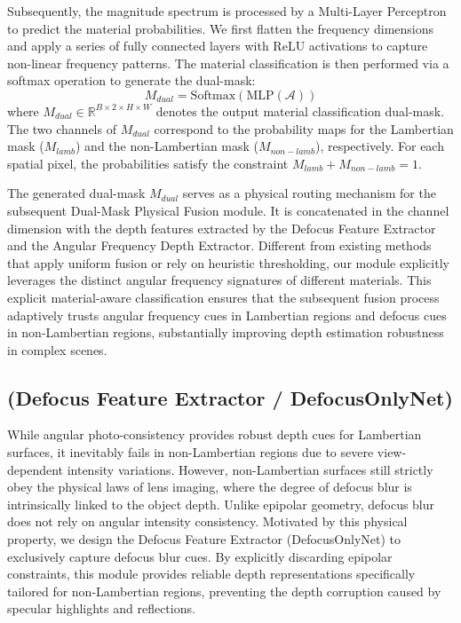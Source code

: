 \documentclass[lettersize,journal]{IEEEtran}
\begin{document}
Subsequently, the magnitude spectrum is processed by a Multi-Layer Perceptron to predict the material probabilities. We first flatten the frequency dimensions and apply a series of fully connected layers with ReLU activations to capture non-linear frequency patterns. The material classification is then performed via a softmax operation to generate the dual-mask:
\begin{equation}
\label{eq:eq2}
M_{dual} = \text{Softmax}(\text{MLP}(\mathcal{A}))
\end{equation}
where $M_{dual} \in \mathbb{R}^{B \times 2 \times H \times W}$ denotes the output material classification dual-mask. The two channels of $M_{dual}$ correspond to the probability maps for the Lambertian mask ($M_{lamb}$) and the non-Lambertian mask ($M_{non-lamb}$), respectively. For each spatial pixel, the probabilities satisfy the constraint $M_{lamb} + M_{non-lamb} = 1$.

The generated dual-mask $M_{dual}$ serves as a physical routing mechanism for the subsequent Dual-Mask Physical Fusion module. It is concatenated in the channel dimension with the depth features extracted by the Defocus Feature Extractor and the Angular Frequency Depth Extractor. Different from existing methods that apply uniform fusion or rely on heuristic thresholding, our module explicitly leverages the distinct angular frequency signatures of different materials. This explicit material-aware classification ensures that the subsequent fusion process adaptively trusts angular frequency cues in Lambertian regions and defocus cues in non-Lambertian regions, substantially improving depth estimation robustness in complex scenes.

\subsection{(Defocus Feature Extractor / DefocusOnlyNet)}

While angular photo-consistency provides robust depth cues for Lambertian surfaces, it inevitably fails in non-Lambertian regions due to severe view-dependent intensity variations. However, non-Lambertian surfaces still strictly obey the physical laws of lens imaging, where the degree of defocus blur is intrinsically linked to the object depth. Unlike epipolar geometry, defocus blur does not rely on angular intensity consistency. Motivated by this physical property, we design the Defocus Feature Extractor (DefocusOnlyNet) to exclusively capture defocus blur cues. By explicitly discarding epipolar constraints, this module provides reliable depth representations specifically tailored for non-Lambertian regions, preventing the depth corruption caused by specular highlights and reflections.
\end{document}
